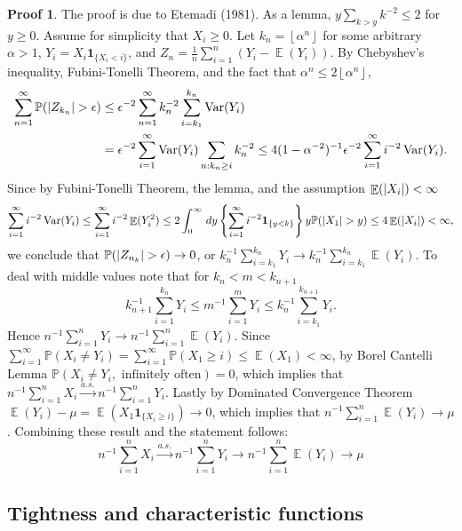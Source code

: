 \documentclass[hidelinks,11pt]{article}
\theoremstyle{definition}
\theoremstyle{dotless}
\newtheorem{prop}{Proof}[section]
\theoremstyle{remark}
\DeclareMathOperator{\Var}{Var}
\DeclareMathOperator{\E}{\mathbb{E}}
\DeclareMathOperator{\1}{\mathbf{1}}
\begin{document}
\begin{prop}
The proof is due to Etemadi (1981). As a lemma, $y\sum_{k>y}k^{-2}\leq2$ for $y\geq0$.\medbreak
Assume for simplicity that $X_i\geq0$. Let $k_n=\left\lfloor{\alpha^n}\right\rfloor$ for some arbitrary $\alpha>1$, $Y_i=X_i\textbf{1}_{\{X_i<i\}}$, and $Z_n=\frac{1}{n}\sum_{i=1}^n(Y_i-\E(Y_i))$.\medbreak
By Chebyshev's inequality,  Fubini-Tonelli Theorem, and the fact that $\alpha^n\leq2\left\lfloor{\alpha^n}\right\rfloor$,
\begin{align*}
\sum_{n=1}^\infty\mathbb{P}(\abs{Z_{k_n}}>\epsilon)&\leq\epsilon^{-2}\sum_{n=1}^\infty k_n^{-2}\sum_{i=k_1}^{k_n}\Var(Y_i)\\
&=\epsilon^{-2}\sum_{i=1}^\infty\Var(Y_i)\sum_{n:k_n\geq i}k_n^{-2}\leq4(1-\alpha^{-2})^{-1}\epsilon^{-2}\sum_{i=1}^\infty i^{-2}\Var(Y_i).
\end{align*}
Since by Fubini-Tonelli Theorem, the lemma, and the assumption $\E(\abs{X_i})<\infty$
\[\sum_{i=1}^\infty i^{-2}\Var(Y_i)\leq\sum_{i=1}^\infty i^{-2}\E(Y_i^2)\leq2\int_0^\infty\,dy\left\{\sum_{i=1}^\infty i^{-2}\textbf{1}_{\{y<k\}}\right\}y\mathbb{P}(\abs{X_1}>y)\leq4\E(\abs{X_i})<\infty,\]
we conclude that $\mathbb{P}(\abs{Z_{n_k}}>\epsilon)\to0$, or $k_n^{-1}\sum_{i=k_1}^{k_n}Y_i\to k_n^{-1}\sum_{i=k_1}^{k_n}\E(Y_i)$. To deal with middle values note that for $k_n<m<k_{n+1}$
\[k_{n+1}^{-1}\sum_{i=1}^{k_n}Y_i\leq m^{-1}\sum_{i=1}^mY_i\leq k_n^{-1}\sum_{i=k_1}^{k_{n+1}}Y_i.\]
Hence $n^{-1}\sum_{i=1}^nY_i\to n^{-1}\sum_{i=1}^n\E(Y_i)$.\medbreak
Since $\sum_{i=1}^\infty\mathbb{P}(X_i\neq Y_i)=\sum_{i=1}^\infty\mathbb{P}(X_1\geq i)\leq\E(X_1)<\infty$, by Borel Cantelli Lemma $\mathbb{P}(X_i\neq Y_i,\textrm{ infinitely often})=0$, which implies that $n^{-1}\sum_{i=1}^nX_i\xrightarrow{a.s.}n^{-1}\sum_{i=1}^nY_i$.\medbreak
Lastly by Dominated Convergence Theorem $\E(Y_i)-\mu=\E(X_1\textbf{1}_{\{X_i\geq i\}})\to0$, which implies that $n^{-1}\sum_{i=1}^n\E(Y_i)\to\mu$. Combining these result and the statement follows:
\[n^{-1}\sum_{i=1}^nX_i\xrightarrow{a.s.}n^{-1}\sum_{i=1}^nY_i\to n^{-1}\sum_{i=1}^n\E(Y_i)\to\mu\]
\end{prop}

\subsection{Tightness and characteristic functions}
\end{document}

